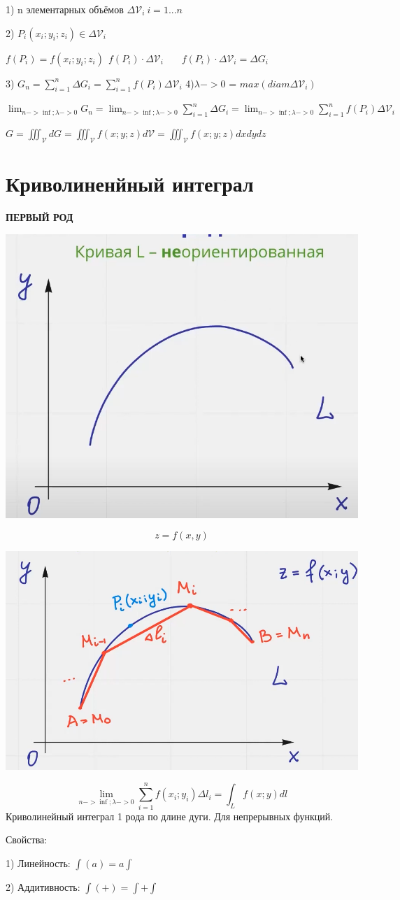 \documentclass{article}
\begin{document}
1) n элементарных объёмов $\Delta \mathcal{V}_i\ i=1...n$

2) $P_i(x_i;y_i;z_i)\in \Delta\mathcal{V}_i$

$f(P_i)=f(x_i;y_i;z_i)\ \ f(P_i)\cdot \Delta \mathcal{V}_i$ \ \ \ $f(P_i)\cdot \Delta \mathcal{V}_i = \Delta G_i$

3) $G_n = \sum_{i=1}^{n}\Delta G_i= \sum_{i=1}^{n}f(P_i)\Delta \mathcal{V}_i$
4)$\lambda -> 0$ = $max(diam\Delta \mathcal{V}_i)$

$\lim_{n->\inf;\lambda->0}G_n = \lim_{n->\inf;\lambda->0}\sum_{i=1}^{n}\Delta G_i= \lim_{n->\inf;\lambda->0}\sum_{i=1}^{n}f(P_i)\Delta \mathcal{V}_i$

$G=\iiint_{\mathcal{V}}dG=\iiint_{\mathcal{V}}f(x;y;z)d\mathcal{V} = \iiint_{\mathcal{V}}f(x;y;z)dxdydz$
\section{Криволиненйный интеграл}
\textbf{ПЕРВЫЙ РОД}
\begin{center}
    \includegraphics[width=.3\textwidth]{rod1.png}
\end{center}
\begin{equation*}
    z = f(x,y)
\end{equation*}
\begin{center}
    \includegraphics[width=.3\textwidth]{krivo12.png}
\end{center}
\begin{equation*}
    \lim_{n->\inf; \lambda->0}\sum_{i=1}^{n}f(x_i; y_i)\Delta l_i = \int_{L}^{}f(x;y)dl
\end{equation*}
Криволинейный интеграл 1 рода по длине дуги. Для непрерывных функций.

Свойства:

1) Линейность: $\int(a) = a\int$

2) Аддитивность: $\int(+) = \int+\int$
\end{document}
